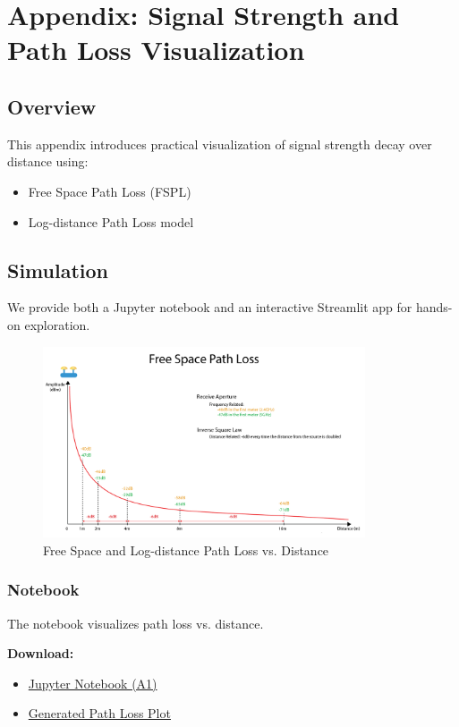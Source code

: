 
\chapter{Appendix: Signal Strength and Path Loss Visualization}

\section{Overview}
This appendix introduces practical visualization of signal strength decay over distance using:
\begin{itemize}
  \item Free Space Path Loss (FSPL)
  \item Log-distance Path Loss model
\end{itemize}

\section{Simulation}
We provide both a Jupyter notebook and an interactive Streamlit app for hands-on exploration.


\begin{figure}[H]
    \centering
    \includegraphics[width=0.85\textwidth]{./figures/fspl_plot.png}
    \caption{Free Space and Log-distance Path Loss vs. Distance}
    \label{fig:fspl_log_loss}
\end{figure}

\subsection{Notebook}
The notebook visualizes path loss vs. distance.

\textbf{Download:}
\begin{itemize}
  \item \href{run:./notebooks/A1-signal_strength.ipynb}{Jupyter Notebook (A1)}
  \item \href{run:./figures/fspl_plot.png}{Generated Path Loss Plot}
\end{itemize}

